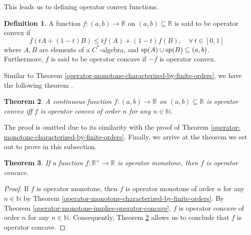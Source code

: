 \documentclass[12pt,a4paper]{amsart}
\newtheorem{theorem}{Theorem}
\theoremstyle{definition}
\newtheorem{definition}[theorem]{Definition}
\begin{document}
	This leads us to defining operator convex functions.
	\begin{definition}
		   A  function $f: (a,b) \rightarrow \mathbb{R}$ on $(a, b) \subseteq \mathbb{R}$ is said to be operator convex if
		\[ f(tA + (1-t)B) \leq t f(A) + (1-t)f(B), \quad \forall \, t \in [0,1]\]
		where $A, B$ are elements of a $C^{*}$-algebra,  and $\textnormal{sp}(A) \cup \textnormal{sp}(B) \subseteq (a,b)$. Furthermore, $f$ is said to be operator concave if $-f$ is operator convex.
	\end{definition}
	
	Similar to Theorem \ref{operator-monotone-characterized-by-finite-orders}, we have the following theorem \cite[Lemma 3.1]{bendat}.
	\begin{theorem}\label{operator-concave-characterized-by-finite-orders}
		A continuous function $ f: (a,b) \rightarrow \mathbb{R} $ on $(a, b) \subseteq \mathbb{R} $ is operator convex iff  $f$ is operator convex of order $n$ for any $n \in \mathbb{N}$.
	\end{theorem}
	The proof is omitted due to its similarity with the proof of Theorem \ref{operator-monotone-characterized-by-finite-orders}. Finally, we arrive at the theorem we set out to prove in this subsection. 
	\begin{theorem}\label{operatpr-monotone-implies-operator-concave}
		If a function $f: \mathbb{R}^{+} \rightarrow \mathbb{R}$ is operator monotone, then $f$ is operator concave.
	\end{theorem}
	\begin{proof}
		If $f$ is operator monotone, then $f$ is operator monotone of order $n$ for any $n \in \mathbb{N}$ by Theorem \ref{operator-monotone-characterized-by-finite-orders}. By Theorem \ref{operator-monotone-implies-operator-concave}, $f$ is operator concave of order $n$ for any $n \in \mathbb{N}$. Consequently, Theorem \ref{operator-concave-characterized-by-finite-orders} allows us to conclude that $f$ is operator concave.
	\end{proof}
	
\end{document}
